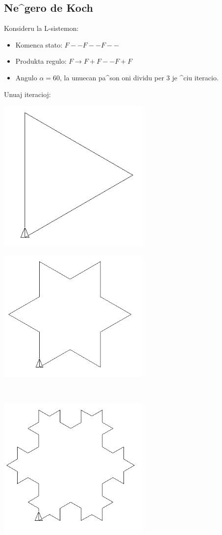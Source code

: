 \subsection{Ne^gero de Koch}
Konsideru la L-sistemon:
\begin{itemize}
 \item [\textbullet] Komenca stato: $F--F--F--$
 \item [\textbullet] Produkta regulo: $F \rightarrow F+F--F+F$
 \item [\textbullet] Angulo $\alpha=60$\degre, la unuecan pa^son oni dividu per $3$ 
   je ^ciu iteracio.
\end{itemize}
Unuaj iteracioj:
\begin{center}
\begin{minipage}{7.5cm}
 \includegraphics[width=7.5cm]{bildoj/linden-flocon1.png}
\end{minipage}
\begin{minipage}{7.5cm}
 \includegraphics[width=7.5cm]{bildoj/linden-flocon2.png}
\end{minipage}\\
\begin{minipage}{7.5cm}
 \includegraphics[width=7.5cm]{bildoj/linden-flocon3.png}

\end{minipage}
\end{center}
